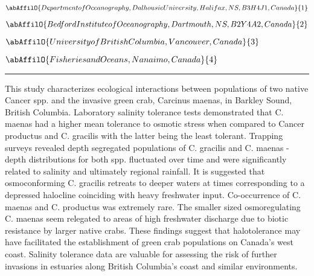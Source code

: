 \begin{minipage}{\linewidth}\begin{center}\begin{minipage}{\linewidth}
   \vspace{2 mm} \begin{center}
    \vspace{2 mm}\begin{center}
  
  $\abAffilO{Department of Oceanography, Dalhousie University, Halifax, NS, B3H 4J1, Canada}{1}$

  
  $\abAffilO{Bedford Institute of Oceanography, Dartmouth, NS, B2Y 4A2, Canada}{2}$

  
  $\abAffilO{University of British Columbia, Vancouver, Canada}{3}$

  
  $\abAffilO{Fisheries and Oceans, Nanaimo, Canada}{4}$

  \end{center}
  \vspace{2 mm}
  \end{center}\end{minipage}\end{center}
  \begin{center}\rule{0.70\linewidth}{0.5 pt}\end{center}
  \begin{minipage}{\linewidth}
\noindent This study characterizes ecological interactions between populations of two native Cancer spp. and the invasive green crab, Carcinus maenas, in Barkley Sound, British Columbia. Laboratory salinity tolerance tests demonstrated that C. maenas had a higher mean tolerance to osmotic stress when compared to Cancer productus and C. gracilis with the latter being the least tolerant. Trapping surveys revealed depth segregated populations of C. gracilis and C. maenas - depth distributions for both spp. fluctuated over time and were significantly related to salinity and ultimately regional rainfall. It is suggested that osmoconforming C. gracilis retreats to deeper waters at times corresponding to a depressed halocline coinciding with heavy freshwater input. Co-occurrence of C. maenas and C. productus was extremely rare. The smaller sized osmoregulating C. maenas seem relegated to areas of high freshwater discharge due to biotic resistance by larger native crabs. These findings suggest that halotolerance may have facilitated the establishment of green crab populations on Canada's west coast. Salinity tolerance data are valuable for assessing the risk of further invasions in estuaries along British Columbia's coast and similar environments.
\end{minipage}\end{minipage}

